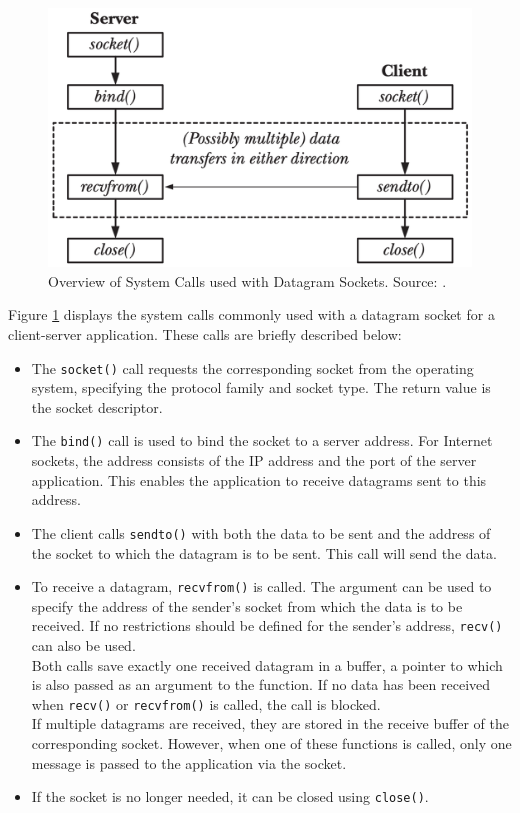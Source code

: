 \begin{figure}[h]
    \centering
    \includegraphics[width=0.75\linewidth]{figures/linux_nwstack/image01.png}
    \caption[Overview of System Calls used with Datagram Sockets]{Overview of System Calls used with Datagram Sockets. Source: \cite{like03}.}
    \label{fig:SocketOperations}
\end{figure}

Figure \ref{fig:SocketOperations} displays the system calls commonly used with a datagram socket for a client-server application. These calls are briefly described below:

\begin{itemize}
\item The \texttt{socket()} call requests the corresponding socket from the operating system, specifying the protocol family and socket type. The return value is the socket descriptor.
\item The \texttt{bind()} call is used to bind the socket to a server address. For Internet sockets, the address consists of the IP address and the port of the server application. This enables the application to receive datagrams sent to this address.
\item The client calls \texttt{sendto()} with both the data to be sent and the address of the socket to which the datagram is to be sent. This call will send the data.
\item \begin{minipage}[t]{\linewidth}
            To receive a datagram, \texttt{recvfrom()} is called. The argument can be used to specify the address of the sender's socket from which the data is to be received. If no restrictions should be defined for the sender's address, \texttt{recv()} can also be used.\\
            Both calls save exactly one received datagram in a buffer, a pointer to which is also passed as an argument to the function. If no data has been received when \texttt{recv()} or \texttt{recvfrom()} is called, the call is blocked.\\
            If multiple datagrams are received, they are stored in the receive buffer of the corresponding socket. However, when one of these functions is called, only one message is passed to the application via the socket.
      \end{minipage}
\item If the socket is no longer needed, it can be closed using \texttt{close()}.
\end{itemize}


